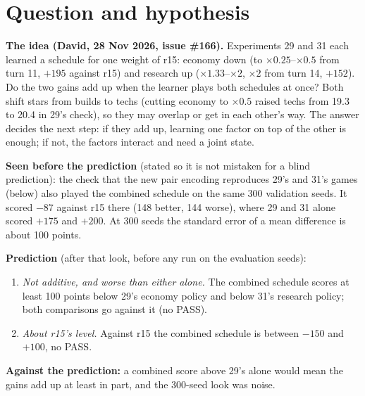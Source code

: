 \documentclass{../polyexp}
\begin{document}

\ExpHeader

\section{Question and hypothesis}
\textbf{The idea (David, 28 Nov 2026, issue \#166).} Experiments 29 and 31 each learned a schedule for one weight of
r15: economy down (to $\times0.25$--$\times0.5$ from turn 11, $+195$ against r15) and research up ($\times1.33$--$\times2$,
$\times2$ from turn 14, $+152$). Do the two gains add up when the learner plays both schedules at once? Both shift
stars from builds to techs (cutting economy to $\times0.5$ raised techs from 19.3 to 20.4 in 29's check), so they may
overlap or get in each other's way. The answer decides the next step: if they add up, learning one factor on top of
the other is enough; if not, the factors interact and need a joint state.

\textbf{Seen before the prediction} (stated so it is not mistaken for a blind prediction): the check that the new
pair encoding reproduces 29's and 31's games (below) also played the combined schedule on the same 300
validation seeds. It scored $-87$ against r15 there (148 better, 144 worse), where 29 and 31 alone scored $+175$ and
$+200$. At 300 seeds the standard error of a mean difference is about 100 points.

\textbf{Prediction} (after that look, before any run on the evaluation seeds):
\begin{enumerate}
  \item \emph{Not additive, and worse than either alone.} The combined schedule scores at least 100 points below
        29's economy policy and below 31's research policy; both comparisons go against it (no PASS).
  \item \emph{About r15's level.} Against r15 the combined schedule is between $-150$ and $+100$, no PASS.
\end{enumerate}
\textbf{Against the prediction:} a combined score above 29's alone would mean the gains add up at least in part,
and the 300-seed look was noise.
\end{document}
